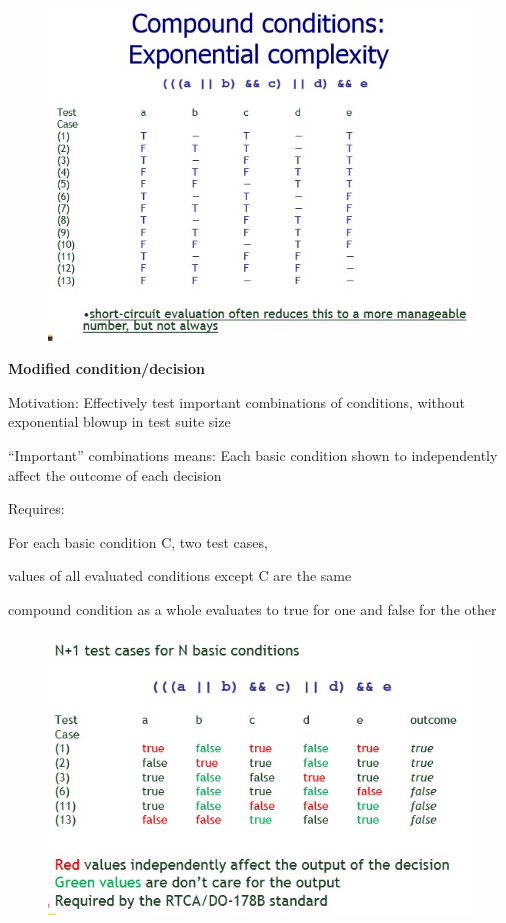 \begin{figure}[h!]
	\centering
	\includegraphics[width=0.7\linewidth]{../images/testingConstraint4.jpg}
	\caption{}
	\label{fig:testingC4}
\end{figure}

\textbf{Modified condition/decision}
\begin{itemize*}
\item Motivation: Effectively test important combinations of conditions, without exponential blowup in test suite size 
\begin{itemize*} 
\item “Important” combinations means: Each basic condition shown to independently affect the outcome of each decision
\end{itemize*}
\item Requires:
\begin{itemize*}
\item For each basic condition C, two test cases,
\item values of all evaluated conditions except C are the same 
\item compound condition as a whole evaluates to true for one and false for the other
\end{itemize*}
\end{itemize*}

\begin{figure}[h!]
	\centering
	\includegraphics[width=0.7\linewidth]{../images/testingConstraint5.jpg}
	\caption{}
	\label{fig:testingC5}
\end{figure}

